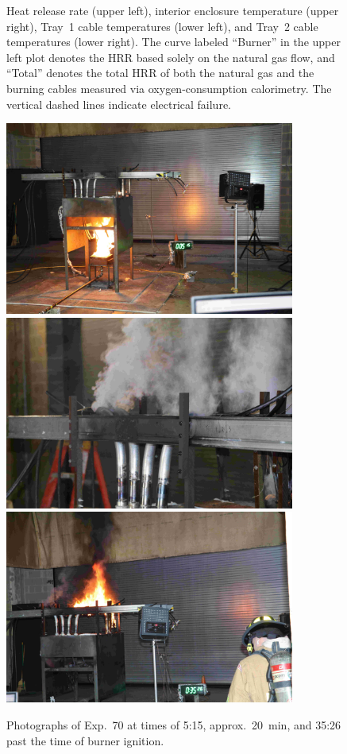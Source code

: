 \begin{figure}[H]
\caption[HRR and temperatures of Exp.~70]{Heat release rate (upper left), interior enclosure temperature (upper right), Tray~1 cable temperatures (lower left), and Tray~2 cable temperatures (lower right). The curve labeled ``Burner'' in the upper left plot denotes the HRR based solely on the natural gas flow, and ``Total'' denotes the total HRR of both the natural gas and the burning cables measured via oxygen-consumption calorimetry. The vertical dashed lines indicate electrical failure.}
\label{fig:Test_70}
\end{figure}

\begin{figure}[p]
\centering
\includegraphics[height=2.50in]{../FIGURES/Test_70_Photo_1} \\ \vspace{0.1in}
\includegraphics[height=2.50in]{../FIGURES/Test_70_Photo_2} \\ \vspace{0.1in}
\includegraphics[height=2.50in]{../FIGURES/Test_70_Photo_3}
\caption[Photographs of Exp.~70]{Photographs of Exp.~70 at times of 5:15, approx.~20~min, and 35:26 past the time of burner ignition.}
\label{fig:Test_70_photos}
\end{figure}



